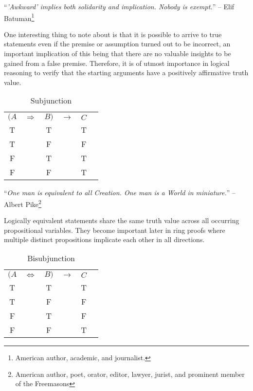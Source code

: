 \begin{displayquote}
	``\emph{'Awkward' implies both solidarity and implication. Nobody is exempt.}''
	-- Elif Batuman\footnote{American author, academic, and journalist.}
\end{displayquote}

One interesting thing to note about  is that it is
possible to arrive to true statements even if the premise or assumption turned out
to be incorrect, an important implication of this being that there are no valuable
insights to be gained from a false premise. Therefore, it is of utmost importance
in logical reasoning to verify that the starting arguments have a positively affirmative
truth value.

\begin{table}[hbt!]
	\centering
	\begin{tabular}{*{6}{c}}
		$(A$ & $\Rightarrow$ & $B)$ & $\rightarrow$ & $C$ \\
		T    &               & T    &               & T   \\
		T    &               & F    &               & F   \\
		F    &               & T    &               & T   \\
		F    &               & F    &               & T   \\
	\end{tabular}
	\caption{Subjunction}\label{table-subjunction}
\end{table}

\begin{displayquote}
	``\emph{One man is equivalent to all Creation. One man is a World in miniature.}''
	-- Albert Pike\footnote{American author, poet, orator, editor, lawyer, jurist,
		and prominent member of the Freemasons}
\end{displayquote}

Logically equivalent statements share the same truth value across all occurring
propositional variables. They become important later in ring proofs where multiple
distinct propositions implicate each other in all directions.

\begin{table}[hbt!]
	\centering
	\begin{tabular}{*{6}{c}}
		$(A$ & $\Leftrightarrow$ & $B)$ & $\rightarrow$ & $C$ \\
		T    &                   & T    &               & T   \\
		T    &                   & F    &               & F   \\
		F    &                   & T    &               & F   \\
		F    &                   & F    &               & T   \\
	\end{tabular}
	\caption{Bisubjunction}\label{table-bisubjunction}
\end{table}


